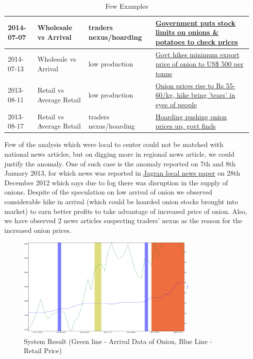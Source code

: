 \begin{table}[H]
{\begin{tabular}{|l|l|l|l|}
2014-07-07           & Wholesale vs Arrival     & traders nexus/hoarding        & \href{http://articles.economictimes.indiatimes.com/2014-07-03/news/51057542_1_stock-limits-onions-ravi-shankar-prasad}{Government puts stock limits on onions \& potatoes to check prices}     \\ \hline
2014-07-13           & Wholesale vs Arrival     & low production                & \href{http://timesofindia.indiatimes.com/india/Govt-to-check-onion-prices-with-imports/articleshow/38282324.cms}{Govt hikes minimum export price of onion to US\$ 500 per tonne}         \\ \hline
2013-08-11           & Retail vs Average Retail & low production                & \href{http://www.dnaindia.com/india/report-onion-prices-rise-to-rs-55-60kg-hike-bring-tears-in-eyes-of-people-1873151}{Onion prices rise to Rs 55-60/kg, hike bring 'tears' in eyes of people} \\ \hline
2013-08-17           & Retail vs Average Retail & traders nexus/hoarding        & \href{http://timesofindia.indiatimes.com/india/Hoarding-pushing-onion-prices-up-govt-finds/articleshow/21872501.cms}{Hoarding pushing onion prices up, govt finds}                           \\ \hline
\end{tabular}}

\caption{Few Examples}
\label{examples}

\end{table}

Few of the analysis which were local to center could not be matched with national news articles, but on digging more in regional news article, we could justify the anomaly. One of such case is the anomaly reported on 7th and 8th January 2013, for which news was reported in \href{http://www.jagran.com/news/business-onion-price-affected-from-fog-9987751.html}{Jagran local news paper} on 28th December 2012 which says due to fog there was disruption in the supply of onions. Despite of the speculation on low arrival of onion we observed considerable hike in arrival (which could be hoarded onion stocks brought into market) to earn better profits to take advantage of increased price of onion. Also, we have observed 2 news articles suspecting traders' nexus as the reason for the increased onion prices.


			\begin{figure}[H]
		    	\centering
  		    	\includegraphics[width=0.8\textwidth]{graphs/localDelhiRegionalNewsPlusNexus.png}
		    	\caption{System Result (Green line - Arrival Data of Onion, Blue Line - Retail Price)}
		    	\label{fig:localExample}
			\end{figure}
			
			